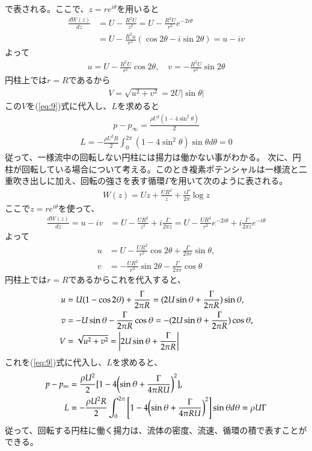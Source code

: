 \documentclass[10pt,b5paper,papersize,dvipdfmx]{jsbook}
\begin{document}
で表される。ここで、$z = re^{i\theta}$を用いると
\begin{align}
  \frac{dW(z)}{dz}
  &= U - \frac{R^2U}{z^2}
  = U - \frac{R^2U}{r^2}e^{-2i\theta} \\
  &= U - \frac{R^2u}{r^2}(\cos2\theta - i\sin2\theta)
  = u - iv
\end{align}
よって
\begin{align}
  u = U - \frac{R^2U}{r^2} \cos2\theta,\quad
  v = -\frac{R^2U}{r^2} \sin2\theta
\end{align}
円柱上では$r = R$であるから
\begin{align}
  V = \sqrt{u^2+v^2}
    = 2U|\sin\theta|
\end{align}
この$V$を(\ref{eq:9})式に代入し、$L$を求めると
\begin{align}
  p - p_\infty = \frac{\rho U^2(1 - 4\sin^2\theta)}{2}
\end{align}
\begin{align}
  L = -\frac{\rho U^2R}{2} \int_0^{2\pi} (1 - 4\sin^2\theta) \sin\theta d\theta 
    = 0
\end{align}
従って、一様流中の回転しない円柱には揚力は働かない事がわかる。
次に、円柱が回転している場合について考える。このとき複素ポテンシャルは一様流と二重吹き出しに加え、回転の強さを表す循環$\Gamma$を用いて次のように表される。
\begin{align}
  W(z) = Uz + \frac{UR^2}{z} + \frac{i\Gamma}{2\pi} \log z
\end{align}
ここで$z=re^{i\theta}$を使って、
\begin{align}
  \frac{dW(z)}{dz}
  = u - iv
  &= U - \frac{UR^2}{z^2} + i\frac{\Gamma}{2\pi z}
  = U - \frac{UR^2}{r^2}e^{-2i\theta} + i\frac{\Gamma}{2\pi z}e^{-i\theta}
\end{align}
よって
\begin{align}
  u &= U - \frac{UR^2}{r^2}\cos 2\theta + \frac{\Gamma}{2\pi r}\sin\theta,\\
  v &= -\frac{UR^2}{r^2}\sin 2\theta - \frac{\Gamma}{2\pi r}\cos\theta
\end{align}
円柱上では$r = R$であるからこれを代入すると、
\begin{align}
  u &= U(1 - \cos 2\theta) + \frac{\Gamma}{2\pi R}
    = (2U\sin\theta + \frac{\Gamma}{2\pi R})\sin\theta,\\
  v &= -U\sin\theta - \frac{\Gamma}{2\pi R}\cos\theta
    = -(2U\sin\theta + \frac{\Gamma}{2\pi R})\cos\theta,\\
  V &= \sqrt{u^2 + v^2} = \qty|2U\sin\theta + \frac{\Gamma}{2\pi R}|
\end{align}
これを(\ref{eq:9})式に代入し、$L$を求めると、
\begin{align}
  p - p_\infty &= \frac{\rho U^2}{2}[1 - 4\qty(\sin\theta + \frac{\Gamma}{4\pi RU})^2],\\
  L &= -\frac{\rho U^2R}{2}\int_0^{2\pi} \qty[1 - 4\qty(\sin\theta + \frac{\Gamma}{4\pi RU})^2]\sin\theta d\theta %
    = \rho U\Gamma
  \label{eq:26}
\end{align}
従って、回転する円柱に働く揚力は、流体の密度、流速、循環の積で表すことができる。
\end{document}

